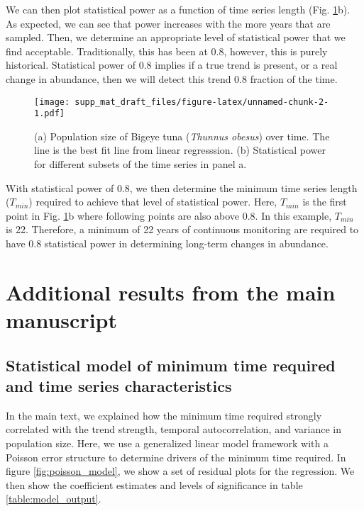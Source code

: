 \documentclass[12pt,]{article}
\begin{document}
We can then plot statistical power as a function of time series length
(Fig. \ref{fig:empirical_approach_example}b). As expected, we can see
that power increases with the more years that are sampled. Then, we
determine an appropriate level of statistical power that we find
acceptable. Traditionally, this has been at 0.8, however, this is purely
historical. Statistical power of 0.8 implies if a true trend is present,
or a real change in abundance, then we will detect this trend 0.8
fraction of the time.

\begin{figure}[htbp]
\centering
\texttt{[image: supp\_mat\_draft\_files/figure-latex/unnamed-chunk-2-1.pdf]}
\caption{(a) Population size of Bigeye tuna (\emph{Thunnus obesus}) over
time. The line is the best fit line from linear regresssion. (b)
Statistical power for different subsets of the time series in panel
a.\label{fig:empirical_approach_example}}
\end{figure}

With statistical power of 0.8, we then determine the minimum time series
length (\(T_{min}\)) required to achieve that level of statistical
power. Here, \(T_{min}\) is the first point in Fig.
\ref{fig:empirical_approach_example}b where following points are also
above 0.8. In this example, \(T_{min}\) is 22. Therefore, a minimum of
22 years of continuous monitoring are required to have 0.8 statistical
power in determining long-term changes in abundance.

\section{Additional results from the main
manuscript}\label{additional-results-from-the-main-manuscript}

\subsection{Statistical model of minimum time required and time series
characteristics}\label{statistical-model-of-minimum-time-required-and-time-series-characteristics}

In the main text, we explained how the minimum time required strongly
correlated with the trend strength, temporal autocorrelation, and
variance in population size. Here, we use a generalized linear model
framework with a Poisson error structure to determine drivers of the
minimum time required. In figure \ref{fig:poisson_model}, we show a set
of residual plots for the regression. We then show the coefficient
estimates and levels of significance in table \ref{table:model_output}.
\end{document}
